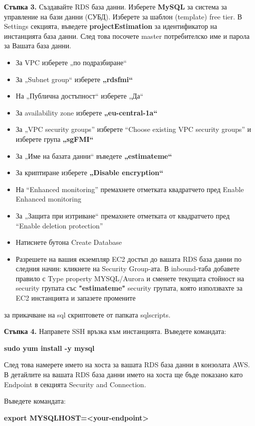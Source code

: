 \documentclass[12pt]{article}
\begin{document}
\medskip

\noindent\textbf{Стъпка 3.} Създавайте RDS база данни. 
Изберете  \textbf{MySQL} за система за управление на бази данни (СУБД).
Изберете за шаблон (template) free tier. В Settings секцията, 
въведете \textbf{projectEstimation} за идентификатор на инстанцията
база данни. След това посочете master потребителско име и парола за Вашата база данни. 
\begin{itemize}
\item За VPC изберете „по подразбиране“
 \item За „Subnet group“ изберете \textbf{„rdsfmi“}
\item На „Публична достъпност“ изберете „Да“
\item За availability zone изберете \textbf{„eu-central-1a“}
\item За „VPC security groups” изберете “Choose existing VPC security groups” и изберете група \textbf{„sgFMI“}
\item За „Име на базата данни“ въведете \textbf{„estimateme“}
\item За криптиране изберете \textbf{„Disable encryption“}
\item На  “Enhanced monitoring” премахнете 
отметката квадратчето пред Enable Enhanced monitoring
\item За „Защита при изтриване“ премахнете отметката от квадратчето пред “Enable deletion protection”
\item Натиснете бутона Create Database
\item  Разрешете на вашия екземпляр EC2 достъп до вашата RDS база данни по следния начин: кликнете на
Security Group-ата. В inbound-таба добавете 
правило  с Type property  MYSQL/Aurora и сменете текущата стойност на security групата със \textbf{"estimateme"} security групата, която използвахте за EC2 инстанцията и запазете промените
\end{itemize}
за прикачване на sql скриптовете
от папката sqlscripts.

\noindent\textbf{Стъпка 4.} Направете SSH връзка към инстанцията.
 Въведете командата:
\medskip

\textbf{sudo yum install -y mysql}\medskip


\noindent След това намерете името на хоста за вашата RDS база данни в конзолата AWS. В детайлите на вашата RDS база данни името на хоста ще бъде показано като Endpoint в секцията Security and Connection.

\medskip Въведете командата:

\medskip
\textbf{export MYSQL\textunderscore HOST=<your-endpoint>}
\end{document}

